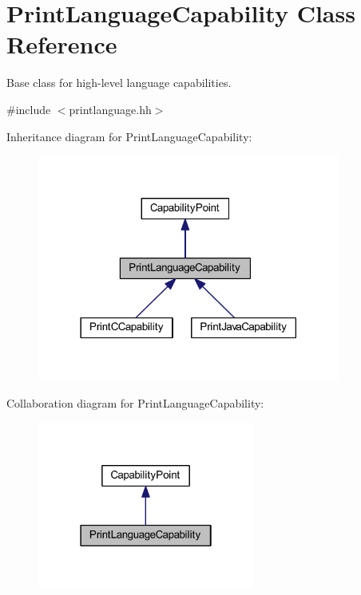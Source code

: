 \hypertarget{class_print_language_capability}{}\section{Print\+Language\+Capability Class Reference}
\label{class_print_language_capability}


Base class for high-\/level language capabilities.  




{\ttfamily \#include $<$printlanguage.\+hh$>$}



Inheritance diagram for Print\+Language\+Capability\+:
\nopagebreak
\begin{figure}[H]
\begin{center}
\leavevmode
\includegraphics[width=282pt]{class_print_language_capability__inherit__graph}
\end{center}
\end{figure}


Collaboration diagram for Print\+Language\+Capability\+:
\nopagebreak
\begin{figure}[H]
\begin{center}
\leavevmode
\includegraphics[width=202pt]{class_print_language_capability__coll__graph}
\end{center}
\end{figure}
